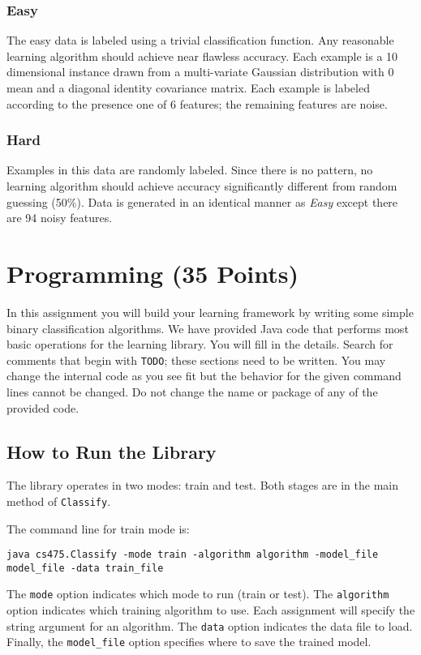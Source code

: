 \documentclass[11pt]{article}
\begin{document}
\subsubsection{Easy}
The easy data is labeled using a trivial classification function. Any reasonable learning algorithm should achieve near flawless accuracy. Each example is a 10 dimensional instance drawn from a multi-variate Gaussian distribution with 0 mean and a diagonal identity covariance matrix. Each example is labeled according to the presence one of 6 features; the remaining features are noise.

\subsubsection{Hard}
Examples in this data are randomly labeled. Since there is no pattern, no learning algorithm should achieve accuracy significantly different from random guessing (50\%). Data is generated in an identical manner as \emph{Easy} except there are 94 noisy features.

\section{Programming (35 Points)}
In this assignment you will build your learning framework by writing some simple binary classification algorithms. We have provided Java code that performs most basic operations for the learning library. You will fill in the details. Search for comments that begin with {\tt TODO}; these sections need to be written. You may change the internal code as you see fit but the behavior for the given command lines cannot be changed. Do not change the name or package of any of the provided code.

\subsection{How to Run the Library}
The library operates in two modes: train and test. Both stages are in the main method of {\tt Classify}. 

The command line for train mode is:
\begin{footnotesize}
\begin{verbatim}
java cs475.Classify -mode train -algorithm algorithm -model_file model_file -data train_file
\end{verbatim}
\end{footnotesize}
The {\tt mode} option indicates which mode to run (train or test). The {\tt algorithm} option indicates which training algorithm to use. Each assignment will specify the string argument for an algorithm. The {\tt data} option indicates the data file to load. Finally, the {\tt model\_file} option specifies where to save the trained model.
\end{document}
